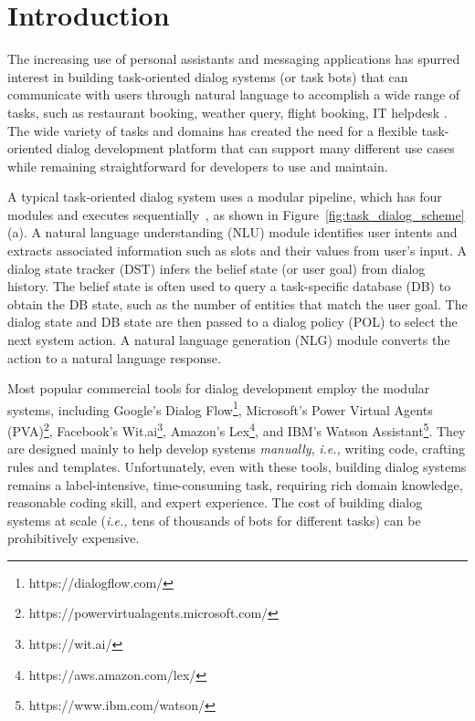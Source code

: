 \documentclass[11pt,a4paper]{article}
\newcommand{\ie}[0]{\emph{i.e., }}
\newcommand{\eg}[0]{\emph{e.g., }}
\begin{document}
\section{Introduction}
The increasing use of personal assistants and messaging applications has spurred interest in building task-oriented dialog systems (or task bots) that can communicate with users through natural language to accomplish a wide range of tasks, such as restaurant booking, weather query, flight booking, IT helpdesk \cite[\eg][]{DBLP:journals/coling/ZhouGLS20,adiwardana2020towards,roller2020recipes,DBLP:journals/corr/abs-2009-03457,DBLP:journals/corr/abs-2012-14666}. 
The wide variety of tasks and domains has created the need for a flexible task-oriented dialog development platform that can support many different use cases while remaining straightforward for developers to use and maintain.

A typical task-oriented dialog system uses a modular pipeline, which has four modules and executes sequentially~\cite{DBLP:journals/pieee/YoungGTW13,gao2019neural}, as shown in Figure~\ref{fig:task_dialog_scheme} (a).
A natural language understanding ({NLU}) module identifies user intents and extracts associated information such as slots and their values from user’s input. A dialog state tracker ({DST}) infers the belief state (or user goal) from dialog history.
The belief state is often used to query a task-specific database (DB) to obtain the DB state, such as the number of entities that match the user goal.
The dialog state and DB state are then passed to a dialog policy ({POL}) to select the next system action.
A natural language generation ({NLG}) module converts the action to a natural language response.

Most popular commercial tools for dialog development employ the modular systems,
including 
Google's Dialog Flow\footnote{{https://dialogflow.com/}},
Microsoft's Power Virtual Agents (PVA)\footnote{{https://powervirtualagents.microsoft.com/}}, 
Facebook's Wit.ai\footnote{{https://wit.ai/}}, 
Amazon's Lex\footnote{{https://aws.amazon.com/lex/}}, and 
IBM's Watson Assistant\footnote{{https://www.ibm.com/watson/}}.
They are designed mainly to help develop systems \emph{manually}, \ie writing code, crafting rules and templates.  
Unfortunately, even with these tools, building dialog systems remains a label-intensive, time-consuming task, requiring rich domain knowledge, reasonable coding skill, and expert experience. 
The cost of building dialog systems at scale (\ie tens of thousands of bots for different tasks)
can be prohibitively expensive.
\end{document}
